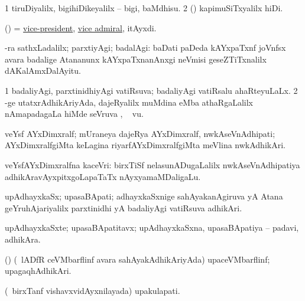\bentry
{} 
\gl{\sakirx}
\expl{}
\bmng
\bnum
\num{1} tiruDiyalilx, bigihiDikeyalilx -- bigi, baMdhisu. 
\num{2} (\rUpa) kapimuSiTxyalilx hiDi. 
\enum
\emng
\eentry

\bentry
{} 
\gl{\nA}
\expl{}
\bmng
 (\AmA) = \hyperlink{vice-president}{vice-president}, \hyperlink{vice admiral}{vice admiral}, itAyxdi. 
\emng
\eentry

\bentry
{} 
\gl{\upa}
\expl{}
\bmng
 -ra sathxLadalilx; parxtiyAgi; badalAgi:  baDati paDeda kAYxpaTxnf joVnfsx avara badalige Atananunx kAYxpaTxnanAnxgi neVmisi geseZTiTxnalilx dAKalAmxDalAyitu. 
\emng
\eentry

\bentry
{} 
\gl{\sapUpa}
\expl{}
\bmng
\bnum
\num{1} badaliyAgi, parxtinidhiyAgi vatiRsuva; badaliyAgi vatiRsalu ahaRteyuLaLx. 
\num{2} -ge utatxrAdhikAriyAda, dajeRyalilx muMdina eMba athaRgaLalilx nAmapadagaLa hiMde seVruva \sapUpa, \udA\  \mo vu. 
\enum
\emng
\eentry

\bentry
{}
\gl{\nA}
\expl{}
\bmng
veYsf AYxDimxralf; mUraneya dajeRya AYxDimxralf, nwkAseVnAdhipati; AYxDimxralfgiMta keLagina riyarfAYxDimxralfgiMta meVlina nwkAdhikAri. 
\emng
\eentry

\bentry
{} 
\gl{\nA}
\bmng
 veYsfAYxDimxralfna kaceVri:  birxTiSf nelasunADugaLalilx nwkAseVnAdhipatiya adhikAravAyxpitxgoLapaTaTx nAyxyamaMDaligaLu. 
\emng
\eentry

\bentry
{} 
\gl{\nA}
\expl{}
\bmng
 upAdhayxkaSx; upasaBApati; adhayxkaSxnige sahAyakanAgiruva yA Atana geYruhAjariyalilx parxtinidhi yA badaliyAgi vatiRsuva adhikAri. 
\emng
\eentry

\bentry
{} 
\gl{\nA}
\expl{}
\bmng
 upAdhayxkaSxte; upasaBApatitavx; upAdhayxkaSxna, upasaBApatiya -- padavi, adhikAra. 
\emng
\eentry

\bentry
{} 
\gl{\nA}
\expl{}
\bmng
 (\birx) (\kanmu\ lADfR ceVMbarflinf avara sahAyakAdhikAriyAda) upaceVMbarflinf; upagaqhAdhikAri. 
\emng
\eentry

\bentry
{} 
\gl{\nA}
\expl{}
\bmng
 (\kanmu\ birxTanf vishavxvidAyxnilayada) upakulapati. 
\emng
\eentry

